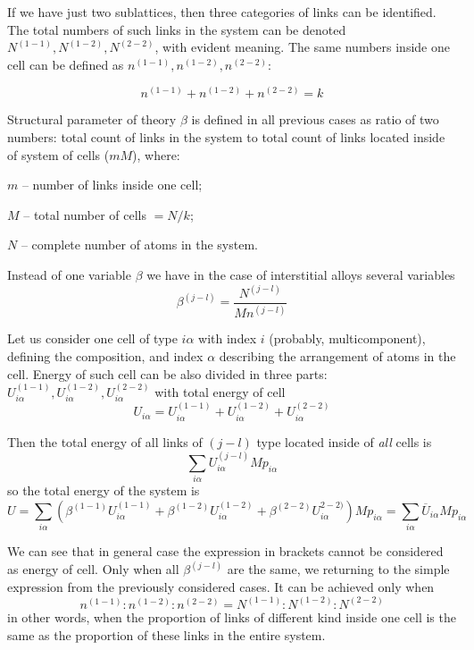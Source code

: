 \documentclass[12pt,abstract]{scrartcl}
\begin{document}
If we have just two sublattices, then three categories of links can be identified. 
The total numbers of such links in the system can be denoted $N^{(1-1)}, N^{(1-2)}, N^{(2-2)}$, with evident meaning. 
The same numbers inside one cell can be defined as 
$n^{(1-1)}, n^{(1-2)}, n^{(2-2)}$:

\[ n^{(1-1)} + n^{(1-2)} + n^{(2-2)} = k\]

Structural parameter of theory $\beta$ is defined in all previous cases as ratio of two numbers: total count of links in the system to total count of links located inside of system of cells ($m M$), where:

$m$ -- number of links inside one cell;

 $M$ -- total number of cells $= N / k$;

 $N$ -- complete number of atoms in the system.
 

Instead of one variable $\beta$ we have in the case  of interstitial alloys several variables 
\[ \beta^{(j-l)} =\frac{ N^{(j-l)}}{M n^{(j-l)}} \]

Let us consider one cell of type $i \alpha$ with index  $i$ (probably, multicomponent), defining the composition, and index $\alpha$ describing the arrangement of atoms in the cell.
Energy of such cell can be also  divided in three parts: $U_{i \alpha}^{(1-1)}, U_{i \alpha}^{(1-2)}, U_{i \alpha}^{(2-2)}$ with total energy of cell
\[
 U_{i \alpha} =  U_{i \alpha}^{(1-1)} +U_{i \alpha}^{(1-2)} +U_{i \alpha}^{(2-2)}
\]

Then the total energy of all links of $(j-l)$ type located inside of \textit{all} cells is 
\[
\sum_{i \alpha}  U_{i \alpha}^{(j-l)}  M p_{i \alpha}
\]
so the total energy of the system is
\begin{equation} \label{U2}
 U = \sum_{i \alpha} \left( \beta^{(1-1)} U_{i \alpha}^{(1-1)}  +\beta^{(1-2)} U_{i \alpha}^{(1-2)}  +\beta^{(2-2)} U_{i \alpha}^{2-2)}\right ) M p_{i \alpha} = \sum_{i \alpha} \overline{U}_{i \alpha} M p_{i \alpha}
\end{equation} 


We can see that in general case the expression in brackets cannot be considered as energy of cell. 
Only when all $\beta^{(j-l)}$ are the same, we returning to the simple expression from the previously considered cases. 
It can be achieved only when
\begin{equation} \label{nN}
n^{(1-1)} : n^{(1-2)} : n^{(2-2)} = N^{(1-1)} : N^{(1-2)} : N^{(2-2)} 
\end{equation}
in other words, when the proportion of links of different kind inside one cell is the same as the proportion of these links in the entire system.
\end{document}
